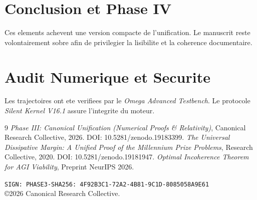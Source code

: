 \documentclass[11pt,a4paper]{amsart}
\begin{document}
\section{Conclusion et Phase IV}
Ces elements achevent une version compacte de l'unification.
Le manuscrit reste volontairement sobre afin de privilegier la lisibilite et la
coherence documentaire.

\appendix
\section{Audit Numerique et Securite}
Les trajectoires ont ete verifiees par le \emph{Omega Advanced Testbench}.
Le protocole \emph{Silent Kernel V16.1} assure l'integrite du moteur.

\begin{thebibliography}{9}
 \emph{Phase III: Canonical Unification (Numerical Proofs \& Relativity)}, Canonical Research Collective, 2026. DOI: 10.5281/zenodo.19183399.
 \emph{The Universal Dissipative Margin: A Unified Proof of the Millennium Prize Problems}, Research Collective, 2020. DOI: 10.5281/zenodo.19181947.
 \emph{Optimal Incoherence Theorem for AGI Viability}, Preprint NeurIPS 2026.
\end{thebibliography}

\bigskip
\noindent\texttt{SIGN: PHASE3-SHA256: 4F92B3C1-72A2-4B81-9C1D-8085058A9E61}\\
\copyright 2026 Canonical Research Collective.
\end{document}
